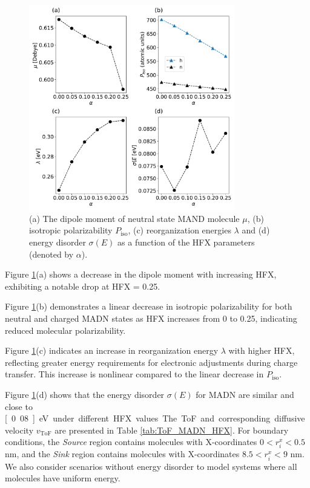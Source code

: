 \documentclass[letterpaper,12pt]{article}
\begin{document}
%
\begin{figure}[H]
    \centering
    \includegraphics[width=0.80\textwidth]{figs/MADN_HFX/fig_autogen.pdf}
    \caption{(a) The dipole moment of neutral state MAND molecule $\mu$, (b) isotropic polarizability $P_\text{iso}$, (c) reorganization energies $\lambda$ and (d) energy disorder $\sigma(E)$ as a function of the HFX parameters (denoted by $\alpha$).}
    \label{fig:autogen_MADN}
\end{figure}
% 


Figure \ref{fig:autogen_MADN}(a) shows a decrease in the dipole moment with increasing HFX, exhibiting a notable drop at HFX = 0.25. 

Figure \ref{fig:autogen_MADN}(b) demonstrates a linear decrease in isotropic polarizability for both neutral and charged MADN states as HFX increases from 0 to 0.25, indicating reduced molecular polarizability.

Figure \ref{fig:autogen_MADN}(c) indicates an increase in reorganization energy $\lambda$ with higher HFX, reflecting greater energy requirements for electronic adjustments during charge transfer. This increase is nonlinear compared to the linear decrease in $P_\text{iso}$.

Figure \ref{fig:autogen_MADN}(d) shows that the energy disorder $\sigma(E)$ for MADN are similar and close to \unit[0.08]{eV} under different HFX values.

The ToF and corresponding diffusive velocity $v_\text{ToF}$ are presented in Table \ref{tab:ToF_MADN_HFX}. For boundary conditions, the \textit{Source} region contains molecules with X-coordinates $0 < r^x_i < 0.5$ nm, and the \textit{Sink} region contains molecules with X-coordinates $8.5 < r^x_i < 9$ nm. We also consider scenarios without energy disorder to model systems where all molecules have uniform energy.
\end{document}

